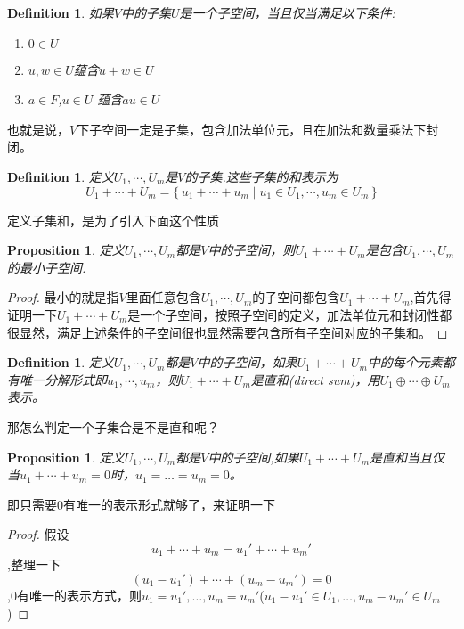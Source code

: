 \documentclass{article}
\newtheorem{proposition}[theorem]{Proposition}
\newtheorem{definition}[theorem]{Definition}
\newcommand\Set[2]{\{\,#1\mid#2\,\}} %
\begin{document}
\begin{definition}
如果$V$中的子集$U$是一个子空间，当且仅当满足以下条件:
\begin{enumerate}
	\item $0 \in U$
	\item $u,w \in U$蕴含$ u+w \in U$
	\item $a \in F$,$u \in U$ 蕴含$au \in U$
\end{enumerate}
\end{definition}

也就是说，$V$下子空间一定是子集，包含加法单位元，且在加法和数量乘法下封闭。

\begin{definition}
定义$U_1,\cdots,U_m$是$V$的子集.这些子集的和表示为\[U_1 + \cdots + U_m = \Set{u_1 + \cdots + u_m}{u_1 \in U_1,\cdots,u_m \in U_m}\]
\end{definition}

定义子集和，是为了引入下面这个性质

\begin{proposition}
定义$U_1,\cdots,U_m$都是$V$中的子空间，则$U_1 + \cdots + U_m$是包含$U_1,\cdots,U_m$的最小子空间.
\end{proposition}

\begin{proof}
最小的就是指$V$里面任意包含$U_1,\cdots,U_m$的子空间都包含$U_1 + \cdots + U_m$,首先得证明一下$U_1 + \cdots + U_m$是一个子空间，按照子空间的定义，加法单位元和封闭性都很显然，满足上述条件的子空间很也显然需要包含所有子空间对应的子集和。
\end{proof}

\begin{definition}
定义$U_1,\cdots,U_m$都是$V$中的子空间，如果$U_1 + \cdots + U_m$中的每个元素都有唯一分解形式即$u_1,\cdots,u_m$，则$U_1 + \cdots + U_m$是直和(direct sum)，用$U_1 \oplus \cdots \oplus U_m$表示。
\end{definition}

{\color{red} 那怎么判定一个子集合是不是直和呢}？

\begin{proposition}
定义$U_1,\cdots,U_m$都是$V$中的子空间,如果$U_1 + \cdots + U_m$是直和当且仅当$u_1+\cdots+u_m = 0$时，$u_1=\ldots=u_m=0$。
\end{proposition}

即只需要$0$有唯一的表示形式就够了，来证明一下

\begin{proof}
假设\[u_1+\cdots+u_m = u_1'+\cdots+u_m'\],整理一下\[(u_1-u_1')+\cdots+(u_m-u_m')=0\],$0$有唯一的表示方式，则$u_1=u_1',\ldots,u_m=u_m'$($u_1-u_1' \in U_1,\ldots,u_m -u_m' \in U_m$)
\end{proof}
\end{document}
